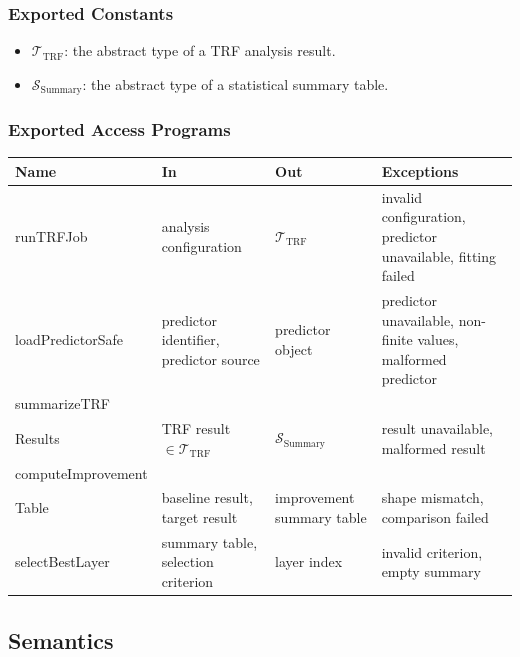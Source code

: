 \documentclass[12pt, titlepage]{article}
\begin{document}
\subsubsection{Exported Constants}

\begin{itemize}
    \item $\mathcal{T}_{\mathrm{TRF}}$: the abstract type of a TRF analysis result.
    \item $\mathcal{S}_{\mathrm{Summary}}$: the abstract type of a statistical summary table.
\end{itemize}

\subsubsection{Exported Access Programs}

\begin{center}
\begin{tabular}{p{3.8cm} p{4.8cm} p{3.8cm} p{3.0cm}}
\hline
\textbf{Name} & \textbf{In} & \textbf{Out} & \textbf{Exceptions} \\
\hline
runTRFJob &
analysis configuration &
$\mathcal{T}_{\mathrm{TRF}}$ &
invalid configuration, predictor unavailable, fitting failed \\

loadPredictorSafe &
predictor identifier, predictor source &
predictor object &
predictor unavailable, non-finite values, malformed predictor \\

summarizeTRF\\Results &
TRF result $\in \mathcal{T}_{\mathrm{TRF}}$ &
$\mathcal{S}_{\mathrm{Summary}}$ &
result unavailable, malformed result \\

computeImprovement\\Table &
baseline result, target result &
improvement summary table &
shape mismatch, comparison failed \\

selectBestLayer &
summary table, selection criterion &
layer index &
invalid criterion, empty summary \\
\hline
\end{tabular}
\end{center}

\subsection{Semantics}
\end{document}
